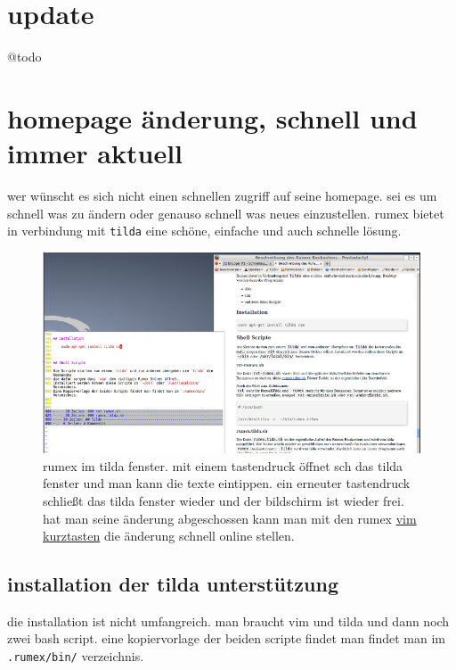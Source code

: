 \section{update}\label{update}

@todo

\section{homepage änderung, schnell und immer
aktuell}\label{homepage-uxe4nderung-schnell-und-immer-aktuell}

wer wünscht es sich nicht einen schnellen zugriff auf seine homepage.
sei es um schnell was zu ändern oder genauso schnell was neues
einzustellen. rumex bietet in verbindung mit \texttt{tilda} eine schöne,
einfache und auch schnelle lösung.

\begin{figure}[htbp]
\centering
\includegraphics{../bilder/rumex-tilda_800_.png}
\caption{rumex im tilda fenster. mit einem tastendruck öffnet sch das
tilda fenster und man kann die texte eintippen. ein erneuter tastendruck
schließt das tilda fenster wieder und der bildschirm ist wieder frei.
hat man seine änderung abgeschossen kann man mit den rumex
\href{vim-kurztasten.html}{vim kurztasten} die änderung schnell online
stellen.}
\end{figure}

\subsection{installation der tilda
unterstützung}\label{installation-der-tilda-unterstuxfctzung}

die installation ist nicht umfangreich. man braucht vim und tilda und
dann noch zwei bash script. eine kopiervorlage der beiden scripte findet
man findet man im \texttt{.rumex/bin/} verzeichnis.

